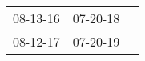 \begin{supertabular}{p{0.33\columnwidth}p{0.33\columnwidth}p{0.33\columnwidth}}
 08-13-16\textsuperscript{} &  07-20-18\textsuperscript{} \\
 08-12-17\textsuperscript{} &  07-20-19\textsuperscript{} \\
\end{supertabular}
